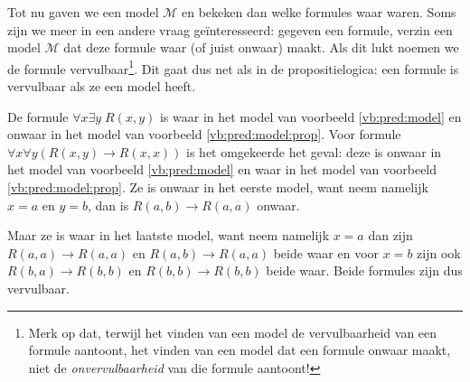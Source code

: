 Tot nu gaven we een model $\mathcal M$ en bekeken dan welke formules waar waren. Soms zijn we meer in een andere vraag ge\"interesseerd: gegeven een formule, verzin een model $\mathcal M$ dat deze formule waar (of juist onwaar) maakt. Als dit lukt noemen we de formule vervulbaar\footnote{Merk op dat, terwijl het vinden van een model de vervulbaarheid van een formule aantoont, het vinden van een model dat een formule onwaar maakt, niet de \textit{onvervulbaarheid} van die formule aantoont!}. Dit gaat dus net als in de propositielogica: een formule is vervulbaar als ze een model heeft.

\begin{example}
De formule $\forall x\exists y\;R(x,y)$ is waar in het model van voorbeeld \ref{vb:pred:model} en onwaar in het model van voorbeeld \ref{vb:pred:model:prop}. Voor formule $\forall x\forall y(R(x,y)\rightarrow R(x,x))$ is het omgekeerde het geval: deze is onwaar in het model van voorbeeld \ref{vb:pred:model} en waar in het model van voorbeeld \ref{vb:pred:model:prop}. Ze is onwaar in het eerste model, want neem namelijk $x=a$ en $y=b$, dan is $R(a,b)\rightarrow R(a,a)$ onwaar.

Maar ze is waar in het laatste model, want neem namelijk $x=a$ dan zijn $R(a,a)\rightarrow R(a,a)$ en $R(a,b)\rightarrow R(a,a)$ beide waar en voor $x=b$ zijn ook $R(b,a)\rightarrow R(b,b)$ en $R(b,b)\rightarrow R(b,b)$ beide waar. Beide formules zijn dus vervulbaar.
\end{example}


